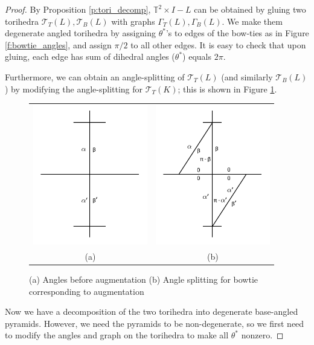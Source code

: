 \documentclass[11pt]{amsart}
\newcommand{\prpref}[1]{Proposition \ref{#1}}
\newcommand{\torus}{{\mathbb{T}^2}}
\newcommand{\sT}{{\mathcal{T}}}
\newcommand{\toruscomp}[1]{{\torus \times I - #1}}
\theoremstyle{plain}
\theoremstyle{definition}
\begin{document}
\begin{proof}
By \prpref{p:tori_decomp}, $\toruscomp{L}$ can be
obtained by gluing two torihedra $\sT_T(L),\sT_B(L)$
with graphs $\Gamma_T(L),\Gamma_B(L)$.
We make them degenerate angled torihedra by assigning $\theta^*$'s
to edges of the bow-ties as in Figure \ref{f:bowtie_angles},
and assign $\pi/2$ to all other edges.
It is easy to check that upon gluing,
each edge has sum of dihedral angles ($\theta^*$) equals $2\pi$.


Furthermore, we can obtain an angle-splitting of $\sT_T(L)$
(and similarly $\sT_B(L)$) by modifying the angle-splitting
for $\sT_T(K)$;
this is shown in Figure \ref{f:bowtie_angles2}.

\begin{figure}
\begin{tabular}{cc}
\includegraphics[width = 5cm]{before_bowtie_angles}&
\includegraphics[width = 5cm]{bowtie_angles}\\
(a)&(b)
\end{tabular}
\caption{(a) Angles before augmentation (b) Angle splitting for bowtie corresponding to augmentation}
\label{f:bowtie_angles2}
\end{figure}

Now we have a decomposition of the two torihedra into
degenerate base-angled pyramids.
However, we need the pyramids to be non-degenerate,
so we first need to modify the angles and graph on the torihedra
to make all $\theta^*$ nonzero.



\end{proof}
\end{document}
